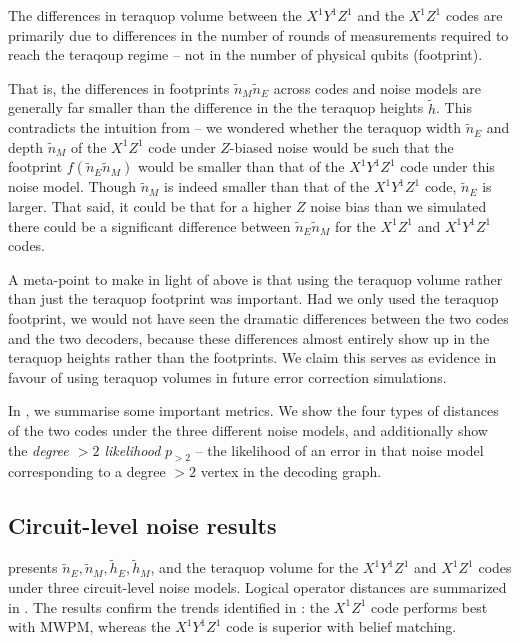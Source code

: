 \begin{keypoint}\label{key:XYZ_XZ_footprints_similar}
The differences in teraquop volume between the $X^1 Y^1 Z^1$ and the $X^1 Z^1$ codes are primarily due to differences in the number of rounds of measurements required to reach the teraqoup regime -- not in the number of physical qubits (footprint).

\end{keypoint}

That is, the differences in footprints $\tilde{n}_M \tilde{n}_E$ across codes and noise models are generally far smaller than the difference in the the teraquop heights $\tilde{h}$.
This contradicts the intuition from  -- we wondered whether the teraquop width $\tilde{n}_E$ and depth $\tilde{n}_M$ of the $X^1 Z^1$ code under $Z$-biased noise would be such that the footprint $f(\tilde{n}_E \tilde{n}_M)$ would be smaller than that of the $X^1 Y^1 Z^1$ code under this noise model.
Though $\tilde{n}_M$ is indeed smaller than that of the $X^1 Y^1 Z^1$ code, $\tilde{n}_E$ is larger.
That said, it could be that for a higher $Z$ noise bias than we simulated there could be a significant difference between $\tilde{n}_E \tilde{n}_M$ for the $X^1Z^1$ and $X^1Y^1Z^1$ codes.

A meta-point to make in light of  above is that using the teraquop volume rather than just the teraquop footprint was important.
Had we only used the teraquop footprint, we would not have seen the dramatic differences between the two codes and the two decoders, because these differences almost entirely show up in the teraquop heights rather than the footprints.
We claim this serves as evidence in favour of using teraquop volumes in future error correction simulations.

In , we summarise some important metrics.
We show the four types of distances of the two codes under the three different noise models,
and additionally show the \textit{degree $> 2$ likelihood} $p_{> 2}$ -- the likelihood of an error in that noise model corresponding to a degree $> 2$ vertex in the decoding graph.


\subsection{Circuit-level noise results}\label{subsec:unrepeated-circuit-level-noise}

 presents $\tilde{n}_E, \tilde{n}_M, \tilde{h}_E, \tilde{h}_M$, and the teraquop volume for the $X^1Y^1Z^1$ and $X^1Z^1$ codes under three circuit-level noise models.
Logical operator distances are summarized in .
The results confirm the trends identified in : the $X^1Z^1$ code performs best with MWPM, whereas the $X^1Y^1Z^1$ code is superior with belief matching.

